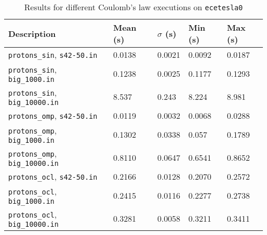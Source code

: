 \documentclass[12pt,reqno]{article}
\begin{document}
\begin{table}[H]
    \centering
    \caption{Results for different Coulomb's law executions on \texttt{ecetesla0}}
    \label{tab:coulombs-results}
    \begin{tabular}{|P{2.5cm}|P{2.5cm}|P{2.5cm}|P{2.5cm}|P{2.5cm}|}
    \hline
    \textbf{Description}& \textbf{Mean (s)} & \textbf{$\sigma$ (s)} & \textbf{Min (s)} & \textbf{Max (s)}\\ \hline 
    \texttt{protons\_sin}, \texttt{s42-50.in} & 0.0138 & 0.0021 & 0.0092 & 0.0187 \\ \hline
    \texttt{protons\_sin}, \texttt{big\_1000.in} & 0.1238 & 0.0025 & 0.1177 & 0.1293 \\ \hline
    \texttt{protons\_sin}, \texttt{big\_10000.in} & 8.537 & 0.243 & 8.224 & 8.981 \\ \hline
    \texttt{protons\_omp}, \texttt{s42-50.in} & 0.0119 & 0.0032 & 0.0068 & 0.0288 \\ \hline
    \texttt{protons\_omp}, \texttt{big\_1000.in} & 0.1302 & 0.0338 & 0.057 & 0.1789 \\ \hline
    \texttt{protons\_omp}, \texttt{big\_10000.in} & 0.8110 & 0.0647 & 0.6541 & 0.8652 \\ \hline   
    \texttt{protons\_ocl}, \texttt{s42-50.in} & 0.2166 & 0.0128 & 0.2070 & 0.2572 \\ \hline
    \texttt{protons\_ocl}, \texttt{big\_1000.in} & 0.2415 & 0.0116 & 0.2277 & 0.2738 \\ \hline
    \texttt{protons\_ocl}, \texttt{big\_10000.in} & 0.3281 & 0.0058 & 0.3211 & 0.3411 \\ \hline    
    \end{tabular}
\end{table}

\clearpage
\end{document}
